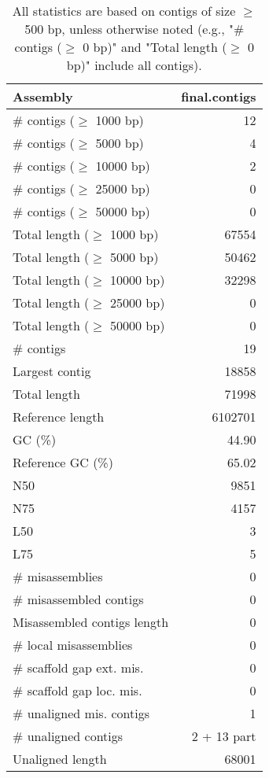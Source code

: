 \documentclass[12pt,a4paper]{article}
\begin{document}
\begin{table}[ht]
\begin{center}
\caption{All statistics are based on contigs of size $\geq$ 500 bp, unless otherwise noted (e.g., "\# contigs ($\geq$ 0 bp)" and "Total length ($\geq$ 0 bp)" include all contigs).}
\begin{tabular}{|l*{1}{|r}|}
\hline
Assembly & final.contigs \\ \hline
\# contigs ($\geq$ 1000 bp) & 12 \\ \hline
\# contigs ($\geq$ 5000 bp) & 4 \\ \hline
\# contigs ($\geq$ 10000 bp) & 2 \\ \hline
\# contigs ($\geq$ 25000 bp) & 0 \\ \hline
\# contigs ($\geq$ 50000 bp) & 0 \\ \hline
Total length ($\geq$ 1000 bp) & 67554 \\ \hline
Total length ($\geq$ 5000 bp) & 50462 \\ \hline
Total length ($\geq$ 10000 bp) & 32298 \\ \hline
Total length ($\geq$ 25000 bp) & 0 \\ \hline
Total length ($\geq$ 50000 bp) & 0 \\ \hline
\# contigs & 19 \\ \hline
Largest contig & 18858 \\ \hline
Total length & 71998 \\ \hline
Reference length & 6102701 \\ \hline
GC (\%) & 44.90 \\ \hline
Reference GC (\%) & 65.02 \\ \hline
N50 & 9851 \\ \hline
N75 & 4157 \\ \hline
L50 & 3 \\ \hline
L75 & 5 \\ \hline
\# misassemblies & 0 \\ \hline
\# misassembled contigs & 0 \\ \hline
Misassembled contigs length & 0 \\ \hline
\# local misassemblies & 0 \\ \hline
\# scaffold gap ext. mis. & 0 \\ \hline
\# scaffold gap loc. mis. & 0 \\ \hline
\# unaligned mis. contigs & 1 \\ \hline
\# unaligned contigs & 2 + 13 part \\ \hline
Unaligned length & 68001 \\ \hline

\end{tabular}
\end{center}
\end{table}
\end{document}
